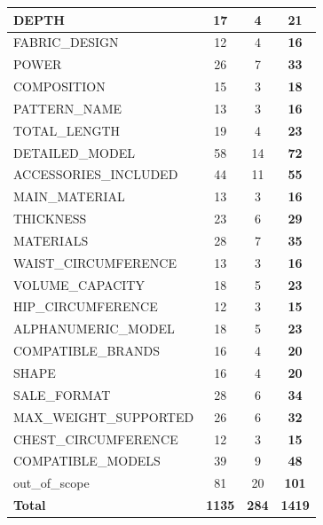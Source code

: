 \begin{table}[ht]
\begin{tabularx}{\textwidth}{|X|c|c|c|}
 DEPTH & 17 & 4 & \textbf{21}\\
 \hline
 FABRIC\_DESIGN & 12 & 4 & \textbf{16}\\
 \hline
 POWER & 26 & 7 & \textbf{33}\\
 \hline
 COMPOSITION & 15 & 3 & \textbf{18}\\
 \hline
 PATTERN\_NAME & 13 & 3 & \textbf{16}\\
 \hline
 TOTAL\_LENGTH & 19 & 4 & \textbf{23}\\
 \hline
 DETAILED\_MODEL & 58 & 14 & \textbf{72}\\
 \hline
 ACCESSORIES\_INCLUDED & 44 & 11 & \textbf{55}\\
 \hline
 MAIN\_MATERIAL & 13 & 3 & \textbf{16}\\
 \hline
 THICKNESS & 23 & 6 & \textbf{29}\\
 \hline
 MATERIALS & 28 & 7 & \textbf{35}\\
 \hline
 WAIST\_CIRCUMFERENCE & 13 & 3 & \textbf{16}\\
 \hline
 VOLUME\_CAPACITY & 18 & 5 & \textbf{23}\\
 \hline
 HIP\_CIRCUMFERENCE & 12 & 3 & \textbf{15}\\
 \hline
 ALPHANUMERIC\_MODEL & 18 & 5 & \textbf{23}\\
 \hline
 COMPATIBLE\_BRANDS & 16 & 4 & \textbf{20}\\
 \hline
 SHAPE & 16 & 4 & \textbf{20}\\
 \hline
 SALE\_FORMAT & 28 & 6 & \textbf{34}\\
 \hline
 MAX\_WEIGHT\_SUPPORTED & 26 & 6 & \textbf{32}\\
 \hline
 CHEST\_CIRCUMFERENCE & 12 & 3 & \textbf{15}\\
 \hline
 COMPATIBLE\_MODELS & 39 & 9 & \textbf{48}\\
 \hline
 out\_of\_scope & 81 & 20 & \textbf{101}\\
 \hline
 \textbf{Total} & \textbf{1135} & \textbf{284} & \textbf{1419}\\
 \hline
\end{tabularx}
\end{table}

